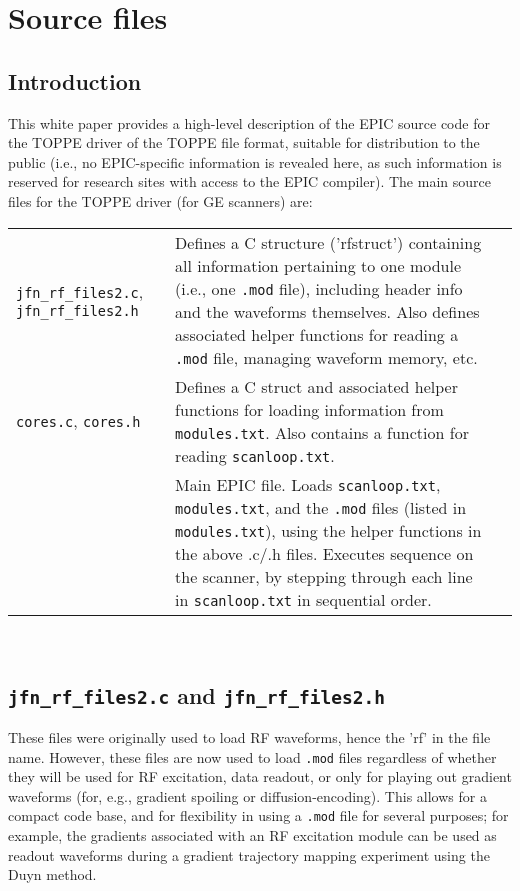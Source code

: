 

\chapter{Source files}
\setcounter{page}{1}

\section{Introduction}
This white paper provides a high-level description of the EPIC source code for the TOPPE driver of the TOPPE file format, suitable for distribution to the public (i.e., no EPIC-specific information is revealed here, as such information is reserved for research sites with access to the EPIC compiler).
The main source files for the TOPPE driver (for GE scanners) are: 
\\ [0.1in]
\begin{tabular}{ p{2.5in} p{4in} l}
  {\tt jfn\_rf\_files2.c}, {\tt jfn\_rf\_files2.h} & Defines a C structure ('rfstruct') containing all information pertaining to one module (i.e., one {\tt .mod} file), including header info and the waveforms themselves. Also defines associated helper functions for reading a {\tt .mod} file, managing waveform memory, etc. \\
  {\tt cores.c}, {\tt cores.h}  & Defines a C struct and associated helper functions for loading information from {\tt modules.txt}. Also contains a function for reading {\tt scanloop.txt}. \\
  \toppe		& Main EPIC file. Loads {\tt scanloop.txt}, {\tt modules.txt}, and the {\tt .mod} files (listed in {\tt modules.txt}), using the helper functions in the above .c/.h files. Executes sequence on the scanner, by stepping through each line in {\tt scanloop.txt} in sequential order. 
\end{tabular} \\ [0.2in]


\section{{\tt jfn\_rf\_files2.c} and {\tt jfn\_rf\_files2.h}}

These files were originally used to load RF waveforms, hence the 'rf' in the file name.
However, these files are now used to load {\tt .mod} files regardless of whether they will be used for RF excitation, data readout, or only for playing out gradient waveforms (for, e.g., gradient spoiling or diffusion-encoding).
This allows for a compact code base, and for flexibility in using a {\tt .mod} file for several purposes; for example, the gradients associated with an RF excitation module can be used as readout waveforms during a gradient trajectory mapping experiment using the Duyn method.

